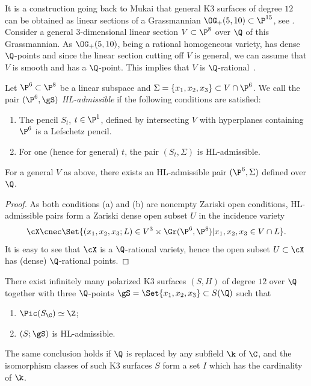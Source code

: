 It is a construction going back to Mukai
that
general
K3 surfaces of degree $12$ can be obtained
as linear sections
of a Grassmannian
$\OG_+(5,10) \subset \P^{15}$, see \cite[2.1]{HassettLai}.
Consider a general $3$-dimensional
linear section $V \subset \P^8$ over $\Q$
of this Grassmannian.
As $\OG_+(5,10)$, being a rational homogeneous variety,
has dense $\Q$-points and since the linear section cutting off $V$ is general,
we can assume that $V$ is smooth and has a $\Q$-point.
This implies that $V$ is $\Q$-rational~\cite[Theorem 1.1]{KuPrRatFano3}.

Let $\P^6 \subset \P^8$ be a linear subspace
and
$\Sigma = \{ x_1, x_2, x_3 \} \subset V \cap \P^6$.
We call the
pair
$(\P^6, \gS)$ \emph{HL-admissible}
if the following conditions are satisfied:
\begin{enumerate}
    \item[(a)] The pencil $S_t$, $t \in \P^1$,
    defined by intersecting
    $V$ with hyperplanes containing $\P^6$ is a Lefschetz pencil.
    \item[(b)] For one (hence for general) $t$, the pair
    $(S_t, \Sigma)$ is HL-admissible.
\end{enumerate}

\begin{lemma}
\notready\label{lem:HL-admis-pencil}
For a general $V$ as above,
there exists an HL-admissible pair $(\P^6, \Sigma)$
defined over $\Q$.
\end{lemma}
\begin{proof}
As both conditions (a) and (b) are nonempty Zariski open conditions,
HL-admissible pairs form a Zariski dense
open subset $U$
in the incidence
variety
$$\cX \cnec \Set{(x_1,x_2,x_3; L) \in V^3 \times \Gr(\P^6,\P^8)
| x_1,x_2,x_3 \in V \cap  L}.$$
It is easy to see that $\cX$ is a $\Q$-rational variety,
hence the open subset $U \subset \cX$ has (dense)
$\Q$-rational points.
\end{proof}

\begin{proposition}
\notready\label{pro-K3HLPic1}
There exist infinitely many polarized K3 surfaces $(S,H)$ of degree $12$ over $\Q$
together with three $\Q$-points $\gS = \Set{x_1,x_2,x_3} \subset S(\Q)$
such that
\begin{enumerate}
    \item $\Pic(S_\C) \simeq \Z $;
\item $(S; \gS)$ is HL-admissible.
\end{enumerate}
The same conclusion holds if $\Q$ is replaced by any subfield $\k$ of $\C$,
and the isomorphism classes of such K3 surfaces $S$
form a set $I$ which has the cardinality of $\k$.
\end{proposition}

